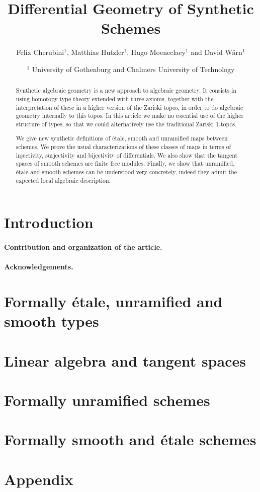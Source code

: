\documentclass{../util/zariski}
\title{Differential Geometry of Synthetic Schemes}
\author{Felix Cherubini$^1$, Matthias Hutzler$^1$, Hugo Moeneclaey$^1$ and David Wärn$^1$}
\date{$^1$ University of Gothenburg and Chalmers University of Technology }
\begin{document}
\maketitle

\begin{abstract}
  Synthetic algebraic geometry is a new approach to algebraic geometry. It consists in using homotopy type theory extended with three axioms, together with the interpretation of these in a higher version of the Zariski topos, in order to do algebraic geometry internally to this topos. In this article we make no essential use of the higher structure of types, so that we could alternatively use the traditional Zariski 1-topos.
  
  We give new synthetic definitions of étale, smooth and unramified maps between schemes.
  We prove the usual characterizations of these classes of maps in terms of injectivity, surjectivity and bijectivity of differentials. We also show that the tangent spaces of smooth schemes are finite free modules.
  Finally, we show that unramified, étale and smooth schemes can be understood very concretely, indeed they admit the expected local algebraic description.
\end{abstract}

\tableofcontents

\section*{Introduction}

\paragraph{Contribution and organization of the article. }

\paragraph{Acknowledgements. }


\section{Formally étale, unramified and smooth types}


\section{Linear algebra and tangent spaces}


\section{Formally unramified schemes}


\section{Formally smooth and étale schemes}


\pagebreak
\appendix
\section{Appendix}


\printindex

\printbibliography
\end{document}
